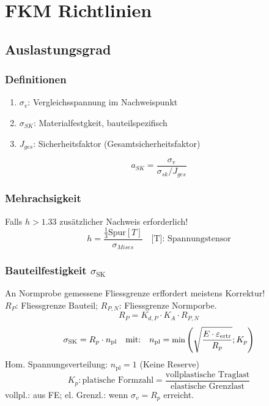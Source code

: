 \vspace{-3mm}
\section{FKM Richtlinien}{}
    \subsection{Auslastungsgrad}
     
        \subsubsection{Definitionen}
            \begin{enumerate}[noitemsep]
                \item $\sigma_{v}$: Vergleichsspannung im Nachweispunkt
                \item $\sigma_{SK}$: Materialfestgkeit, bauteilspezifisch
                \item $J_{ges}$: Sicherheitsfaktor (Gesamtsicherheitsfaktor)
            \end{enumerate}
            \[a_{SK} = \frac{\sigma_{v}}{\sigma_{sk}/J_{ges}} \]
    
        \subsubsection{Mehrachsigkeit}
            Falls $h > 1.33$ zusätzlicher Nachweis erforderlich! 
            \[ h = \frac{\frac{1}{3} \textrm{Spur}[T]}{\sigma_{Mises}} \quad \textrm{[T]: Spannungstensor}\]
        \subsubsection{Bauteilfestigkeit $\sigma_{\textrm{SK}}$}
            An Normprobe gemessene Fliessgrenze erffordert meistens Korrektur! \\$R_P$: Fliessgrenze Bauteil; $R_{P,N}$: Fliessgrenze Normporbe.
            \vspace{-2mm}
            \[R_P = K_{d,P}\cdot K_A\cdot R_{P,N}\]
            \vspace{-5mm}
            \[\sigma_{\textrm{SK}}=R_p\cdot n_{\textrm{pl}} \quad\textrm{mit:}\quad \small n_{\textrm{pl}}=\textrm{min} \left( \sqrt{ \frac{E\cdot\varepsilon_{\textrm{ertr}}}{R_p}};K_p \right) \]\normalsize
            Hom. Spannungsverteilung: $n_{\textrm{pl}}=1$ (Keine Reserve)
            \vspace{-2mm}
            \[K_p: \textrm{platische Formzahl} = \frac{\textrm{vollplastische Traglast}}{\textrm{elastische Grenzlast}}\]
            vollpl.: aus FE; el. Grenzl.: wenn $\sigma_v = R_p$ erreicht.
